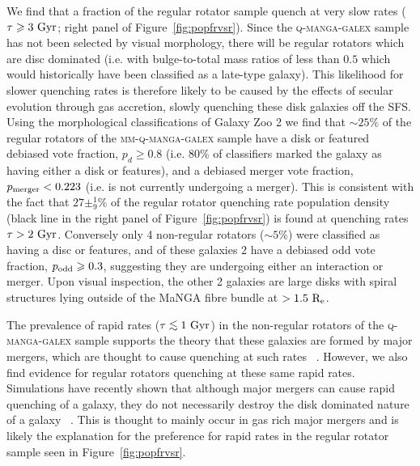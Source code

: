 \documentclass[useAMS,usenatbib]{mn2e}
\def\lesssim{\mathrel{\hbox{\rlap{\hbox{\lower3pt\hbox{$\sim$}}}\hbox{\raise2pt\hbox{$<$}}}}}
\begin{document}
We find that a fraction of the regular rotator sample quench at very slow rates ($\tau \geq 3~\rm{Gyr}$; right panel of Figure~\ref{fig:popfrvsr}). Since the \textsc{q-manga-galex} sample has not been selected by visual morphology, there will be regular rotators which are disc dominated (i.e. with bulge-to-total mass ratios of less than $0.5$ which would historically have been classified as a late-type galaxy). This likelihood for slower quenching rates is therefore likely to be caused by the effects of secular evolution through gas accretion, slowly quenching these disk galaxies off the SFS. Using the morphological classifications of Galaxy Zoo 2 \citep{lintott11, GZ2} we find that $\sim 25\%$ of the regular rotators of the \textsc{mm-q-manga-galex} sample have a disk or featured debiased vote fraction, $p_d \geq 0.8$ (i.e. $80\%$ of classifiers marked the galaxy as having either a disk or features), and a debiased merger vote fraction, $p_{\rm{merger}} < 0.223$ (i.e. is not currently undergoing a merger). This is consistent with the fact that $27\pm^{1}_{9}\%$ of the regular rotator quenching rate population density (black line in the right panel of Figure~\ref{fig:popfrvsr}) is found at quenching rates $\tau > 2~\rm{Gyr}$. Conversely only 4 non-regular rotators ($\sim5\%$) were classified as having a disc or features, and of these galaxies $2$ have a debiased odd vote fraction, $p_{\rm{odd}} \geq 0.3$, suggesting they are undergoing either an interaction or merger. Upon visual inspection, the other 2 galaxies are large disks with spiral structures lying outside of the MaNGA fibre bundle at $>1.5~\rm{R_e}$.

The prevalence of rapid rates ($\tau\lesssim1~\rm{Gyr}$) in the non-regular rotators of the \textsc{q-manga-galex} sample supports the theory that these galaxies are formed by major mergers, which are thought to cause quenching at such rates ~\citep{springel05b, bell06, lotz08b,lotz11,smethurst15}. However, we also find evidence for regular rotators quenching at these same rapid rates. Simulations have recently shown that although major mergers can cause rapid quenching of a galaxy, they do not necessarily destroy the disk dominated nature of a galaxy ~\citep{pontzen16, sparre16}. This is thought to mainly occur in gas rich major mergers and is likely the explanation for the preference for rapid rates in the regular rotator sample seen in Figure~\ref{fig:popfrvsr}.
\end{document}

